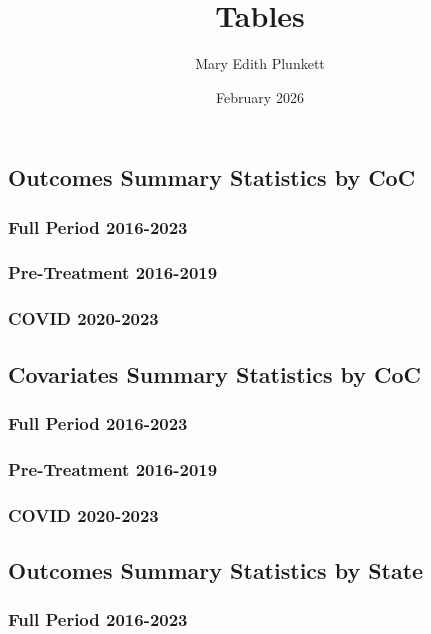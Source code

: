 \documentclass{article}
\title{Tables}
\author{Mary Edith Plunkett}
\date{February 2026}
\begin{document}
\tableofcontents
{}

\newpage
\subsection*{Outcomes Summary Statistics by CoC}
\subsubsection*{Full Period 2016-2023}

\subsubsection*{Pre-Treatment 2016-2019}

\subsubsection*{COVID 2020-2023}



\newpage
\subsection*{Covariates Summary Statistics by CoC}
\subsubsection*{Full Period 2016-2023}

\subsubsection*{Pre-Treatment 2016-2019}

\subsubsection*{COVID 2020-2023}


\newpage
{}
\subsection*{Outcomes Summary Statistics by State}
\subsubsection*{Full Period 2016-2023}

\end{document}
